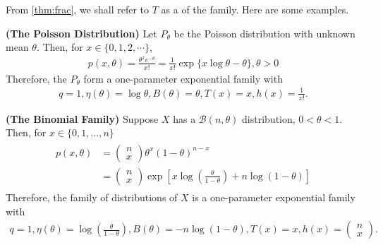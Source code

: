 \documentclass{article}
\newcommand{\bfs}[1]{\textbf{({#1}) }}
\begin{document}
From \cref{thm:frac}, we shall refer to $T$ as a  of the family.
Here are some examples.
\begin{exma}\bfs{The Poisson Distribution}\label{possion_0}
 Let $P_{\theta}$ be the Poisson distribution with unknown mean $\theta$. Then, for $x \in\{0,1,2, \cdots\}$,
\begin{align*}
p(x, \theta)=\frac{\theta^{x} e^{-\theta}}{x !}=\frac{1}{x !} \exp \{x \log \theta-\theta\}, \theta>0
\end{align*}
Therefore, the $P_{\theta}$ form a one-parameter exponential family with
\begin{align*}
q=1, \eta(\theta)=\log \theta, B(\theta)=\theta, T(x)=x, h(x)=\frac{1}{x !} .
\end{align*}
\end{exma}
\begin{exma}\bfs{The Binomial Family}\label{ex:bionomia_0}
Suppose $X$ has a $\mathcal{B}(n, \theta)$ distribution, $0<\theta<1$. Then, for $x \in\{0,1, \ldots, n\}$
\begin{align*}
\begin{aligned}
p(x, \theta) &=\left(\begin{array}{l}
n \\
x
\end{array}\right) \theta^{x}(1-\theta)^{n-x} \\
&=\left(\begin{array}{l}
n \\
x
\end{array}\right) \exp \left[x \log \left(\frac{\theta}{1-\theta}\right)+n \log (1-\theta)\right]
\end{aligned}
\end{align*}
Therefore, the family of distributions of $X$ is a one-parameter exponential family with
\begin{align*}
q=1, \eta(\theta)=\log \left(\frac{\theta}{1-\theta}\right), B(\theta)=-n \log (1-\theta), T(x)=x, h(x)=\left(\begin{array}{l}
n \\
x
\end{array}\right) \text {. }
\end{align*}
\end{exma}
\end{document}
